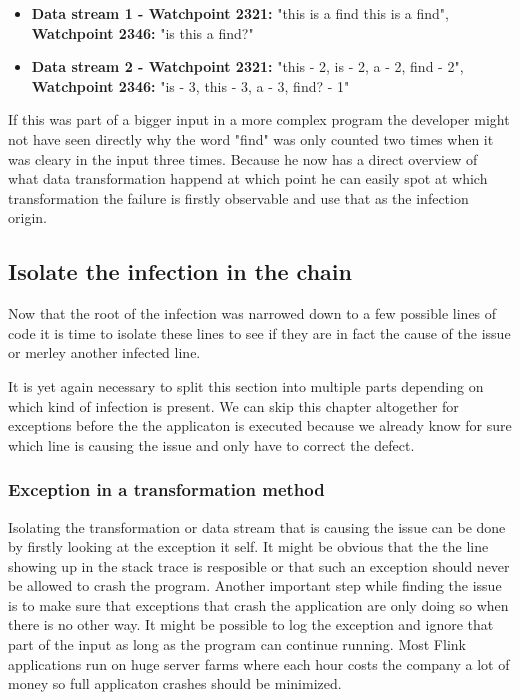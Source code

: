 \begin{itemize}
  \item \textbf{Data stream 1 - Watchpoint 2321:} "this is a find this is a find", \textbf{Watchpoint 2346:} "is this a find?"
  \item \textbf{Data stream 2 - Watchpoint 2321:} "this - 2, is - 2, a - 2, find - 2", \textbf{Watchpoint 2346:} "is - 3, this - 3, a - 3, find? - 1"
\end{itemize}

If this was part of a bigger input in a more complex program the developer might not have seen directly why the word "find" was only counted two times when it was cleary in the input three times. Because he now has a direct overview of what data transformation happend at which point he can easily spot at which transformation the failure is firstly observable and use that as the infection origin.

\subsection{Isolate the infection in the chain}
\label{mdfIsolateInfection}
Now that the root of the infection was narrowed down to a few possible lines of code it is time to isolate these lines to see if they are in fact the cause of the issue or merley another infected line.

It is yet again necessary to split this section into multiple parts depending on which kind of infection is present. We can skip this chapter altogether for exceptions before the the applicaton is executed because we already know for sure which line is causing the issue and only have to correct the defect.

\subsubsection{Exception in a transformation method}
Isolating the transformation or data stream that is causing the issue can be done by firstly looking at the exception it self. It might be obvious that the the line showing up in the stack trace is resposible or that such an exception should never be allowed to crash the program. Another important step while finding the issue is to make sure that exceptions that crash the application are only doing so when there is no other way. It might be possible to log the exception and ignore that part of the input as long as the program can continue running. Most Flink applications run on huge server farms where each hour costs the company a lot of money so full applicaton crashes should be minimized.

